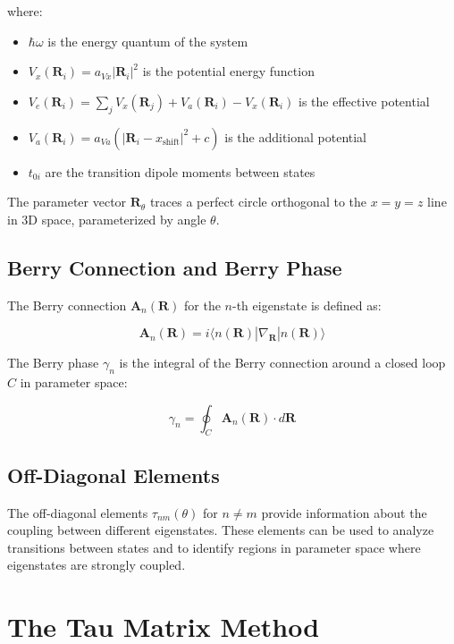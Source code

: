 \documentclass{article}
\begin{document}
where:
\begin{itemize}
    \item $\hbar\omega$ is the energy quantum of the system
    \item $V_x(\bm{R}_i) = a_{Vx} |\bm{R}_i|^2$ is the potential energy function
    \item $V_e(\bm{R}_i) = \sum_j V_x(\bm{R}_j) + V_a(\bm{R}_i) - V_x(\bm{R}_i)$ is the effective potential
    \item $V_a(\bm{R}_i) = a_{Va} (|\bm{R}_i - x_{\text{shift}}|^2 + c)$ is the additional potential
    \item $t_{0i}$ are the transition dipole moments between states
\end{itemize}

The parameter vector $\bm{R}_\theta$ traces a perfect circle orthogonal to the $x=y=z$ line in 3D space, parameterized by angle $\theta$.

\subsection{Berry Connection and Berry Phase}

The Berry connection $\bm{A}_n(\bm{R})$ for the $n$-th eigenstate is defined as:

\begin{equation}
\bm{A}_n(\bm{R}) = i\langle n(\bm{R})|\nabla_{\bm{R}}|n(\bm{R})\rangle
\end{equation}

The Berry phase $\gamma_n$ is the integral of the Berry connection around a closed loop $C$ in parameter space:

\begin{equation}
\gamma_n = \oint_C \bm{A}_n(\bm{R}) \cdot d\bm{R}
\end{equation}

\subsection{Off-Diagonal Elements}

The off-diagonal elements $\tau_{nm}(\theta)$ for $n \neq m$ provide information about the coupling between different eigenstates. These elements can be used to analyze transitions between states and to identify regions in parameter space where eigenstates are strongly coupled.


\section{The Tau Matrix Method}
\end{document}
